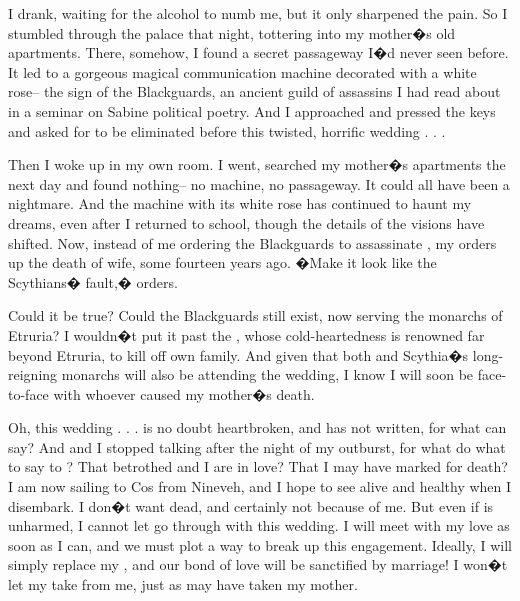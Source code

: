 \documentclass[char]{Kos}
\begin{document}
I drank, waiting for the alcohol to numb me, but it only sharpened the pain. So I stumbled through the palace that night, tottering into my mother�s old apartments. There, somehow, I found a secret passageway I�d never seen before. It led to a gorgeous magical communication machine decorated with a white rose-- the sign of the Blackguards, an ancient guild of assassins I had read about in a seminar on Sabine political poetry. And I approached and pressed the keys and asked for \cGroom{\nickname} to be eliminated before this twisted, horrific wedding . . .

Then I woke up in my own room. I went, searched my mother�s apartments the next day and found nothing-- no machine, no passageway. It could all have been a nightmare. And the machine with its white rose has continued to haunt my dreams, even after I returned to school, though the details of the visions have shifted. Now, instead of me ordering the Blackguards to assassinate \cGroom{\nickname}, my \cEtruriaKing{\parent} orders up the death of \cEtruriaKing{\their} wife, some fourteen years ago. �Make it look like the Scythians� fault,� \cEtruriaKing{\they} orders.

Could it be true? Could the Blackguards still exist, now serving the monarchs of Etruria? I wouldn�t put it past the \cEtruriaKing{\monarch}, whose cold-heartedness is renowned far beyond Etruria, to kill off \cEtruriaKing{\their} own family. And given that both \cEtruriaKing{\they} and Scythia�s long-reigning monarchs will also be attending the wedding, I know I will soon be face-to-face with whoever caused my mother�s death.

Oh, this wedding . . . \cBride{\nickname} is no doubt heartbroken, and \cBride{\they} has not written, for what can \cBride{\nickname} say? And \cGroom{\nickname} and I stopped talking after the night of my outburst, for what do what to say to \cGroom{\them}? That \cGroom{\their} betrothed and I are in love? That I may have marked \cGroom{\them} for death? I am now sailing to Cos from Nineveh, and I hope to see \cGroom{\them} alive and healthy when I disembark. I don�t want \cGroom{\them} dead, and certainly not because of me. But even if \cGroom{\they} is unharmed, I cannot let \cGroom{\them} go through with this wedding. I will meet with my love as soon as I can, and we must plot a way to break up this engagement. Ideally, I will simply replace my \cGroom{\sibling}, and our bond of love will be sanctified by marriage! I won�t let my \cEtruriaKing{\parent} take \cBride{\nickname} from me, just as \cEtruriaKing{\they} may have taken my mother. 
\end{document}
